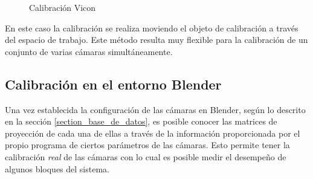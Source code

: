 \begin{figure}[H]
        \centering
        
        \hspace{1.8cm}
  \caption{Calibración Vicon}
      \label{vicon}
\end{figure}

En este caso la calibración se realiza moviendo el objeto de calibración a través del espacio de trabajo. Este método resulta muy flexible para la calibración de un conjunto de varias cámaras simultáneamente.


\subsection{Calibración en el entorno Blender}

Una vez establecida la configuración de las cámaras en  Blender, según lo descrito en la sección \ref{section_base_de_datos}, es posible conocer las matrices de proyección de cada una de ellas a través de la información proporcionada por el propio programa de ciertos parámetros de las cámaras. Esto permite tener la calibración \textit{real} de las cámaras con lo cual es posible medir el desempeño de algunos bloques del sistema.\\

